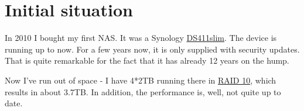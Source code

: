 \section{Initial situation}

In 2010 I bought my first \gls{NAS}. It was a \gls{Synology}
\href{https://global.download.synology.com/download/Document/Hardware/DataSheet/DiskStation/11-year/DS411slim/ger/Synology_DS411slim_Data_Sheet_ger.pdf}{DS411slim}.
The device is running up to now. For a few years now, it is only supplied with
security updates. That is quite remarkable for the fact that it has already 12
years on the hump.
\bigbreak

Now I've run out of space - I have 4*2TB running there in \href{https://en.wikipedia.org/wiki/RAID}{RAID 10},
which results in about 3.7TB. In addition, the performance is, well, not quite up
to date.
